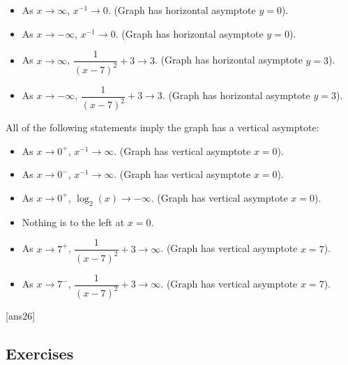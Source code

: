 \documentclass{amsbook}
\numberwithin{section}{chapter}
\numberwithin{equation}{chapter}
\begin{document}
\bigskip
\begin{itemize}
	\item As $x \to \infty$, $x^{-1} \to 0$.  (Graph has horizontal asymptote $y=0$).
	\item As $x \to -\infty$, $x^{-1} \to 0$. (Graph has horizontal asymptote $y=0$). 
\end{itemize}

\bigskip
\begin{itemize}
	\item As $x \to \infty$, $\dfrac{1}{(x-7)^2}+3 \to 3$.  (Graph has horizontal asymptote $y=3$).
	\item As $x \to -\infty$, $\dfrac{1}{(x-7)^2}+3 \to 3$. (Graph has horizontal asymptote $y=3$). 
\end{itemize}



All of the following statements imply the graph has a vertical asymptote:
\begin{itemize}
	\item As $x \to 0^+$, $x^{-1} \to \infty$.  (Graph has vertical asymptote $x=0$).
	\item As $x \to 0^-$, $x^{-1} \to \infty$.  (Graph has vertical asymptote $x=0$).
\end{itemize}

\bigskip
\begin{itemize}
	\item As $x \to 0^+$, $\log_2 (x) \to -\infty$.  (Graph has vertical asymptote $x=0$).
	\item Nothing is to the left at $x=0$.
\end{itemize}

\bigskip
\begin{itemize}
	\item As $x \to 7^+$, $\dfrac{1}{(x-7)^2}+3 \to \infty$.  (Graph has vertical asymptote $x=7$).
	\item As $x \to 7^-$, $\dfrac{1}{(x-7)^2}+3 \to \infty$.  (Graph has vertical asymptote $x=7$).
\end{itemize}


[ans26]
\subsection*{Exercises \nopunct} \hfill
\end{document}
